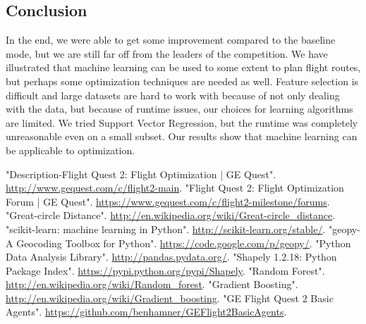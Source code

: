 \documentclass{article}[12pt]
\begin{document}
\begin{multicols}{2}
\section{Conclusion}
In the end, we were able to get some improvement compared to the baseline mode, but we are still far off from the leaders of the competition. We have illustrated that machine learning can be used to some extent to plan flight routes, but perhaps some optimization techniques are needed as well. Feature selection is difficult and large datasets are hard to work with because of not only dealing with the data, but because of runtime issues, our choices for learning algorithms are limited. We tried Support Vector Regression, but the runtime was completely unreasonable even on a small subset. Our results show that machine learning can be applicable to optimization.


\begin{thebibliography}{1}

 "Description-Flight Quest 2: Flight Optimization | GE Quest". \url{http://www.gequest.com/c/flight2-main}.
 "Flight Quest 2: Flight Optimization Forum | GE Quest". \url{https://www.gequest.com/c/flight2-milestone/forums}.
 "Great-circle Distance". \url{http://en.wikipedia.org/wiki/Great-circle_distance}.
 "scikit-learn: machine learning in Python". \url{http://scikit-learn.org/stable/}.
 "geopy-A Geocoding Toolbox for Python". \url{https://code.google.com/p/geopy/}.
 "Python Data Analysis Library". \url{http://pandas.pydata.org/}.
 "Shapely 1.2.18: Python Package Index". \url{https://pypi.python.org/pypi/Shapely}.
 "Random Forest". \url{http://en.wikipedia.org/wiki/Random_forest}.
 "Gradient Boosting". \url{http://en.wikipedia.org/wiki/Gradient_boosting}.
 "GE Flight Quest 2 Basic Agents". \url{https://github.com/benhamner/GEFlight2BasicAgents}.
\end{thebibliography}
\end{multicols}
\end{document}
